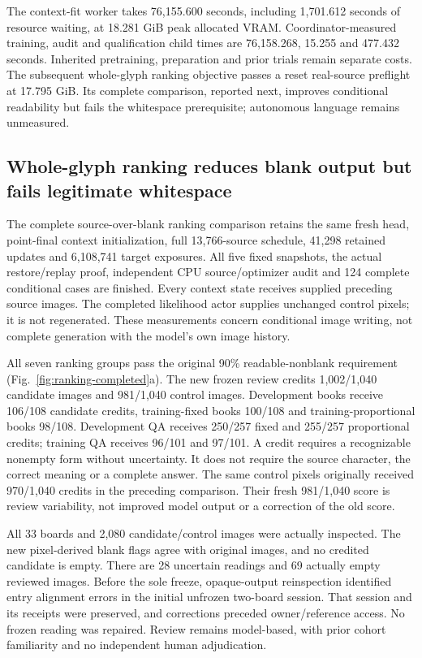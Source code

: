 \documentclass[12pt,a4paper]{article}
\providecommand{\DIFadd}[1]{{\protect\color{blue} \sf #1}} %
\begin{document}
\DIFadd{The context-fit worker takes 76,155.600 seconds, including 1,701.612 seconds of
resource waiting, at 18.281 GiB peak allocated VRAM. Coordinator-measured
training, audit and qualification child times are 76,158.268, 15.255 and
477.432 seconds. Inherited pretraining, preparation and prior trials remain
separate costs. The subsequent whole-glyph ranking objective passes a reset
real-source preflight at 17.795 GiB. Its complete comparison, reported next,
improves conditional readability but fails the whitespace prerequisite;
autonomous language remains unmeasured.
}

\subsection*{\DIFadd{Whole-glyph ranking reduces blank output but fails legitimate whitespace}}

\DIFadd{The complete source-over-blank ranking comparison retains the same fresh head,
point-final context initialization, full 13,766-source schedule, 41,298 retained
updates and 6,108,741 target exposures. All five fixed snapshots, the actual
restore/replay proof, independent CPU source/optimizer audit and 124 complete
conditional cases are finished. Every context state receives supplied preceding
source images. The completed likelihood actor supplies unchanged control pixels;
it is not regenerated. These measurements concern conditional image writing,
not complete generation with the model's own image history.
}

\DIFadd{All seven ranking groups pass the original 90\% readable-nonblank requirement
(Fig.~\ref{fig:ranking-completed}a). The new frozen review credits 1,002/1,040
candidate images and 981/1,040 control images. Development books receive 106/108
candidate credits, training-fixed books 100/108 and training-proportional books
98/108. Development QA receives 250/257 fixed and 255/257 proportional credits;
training QA receives 96/101 and 97/101. A credit requires a recognizable nonempty
form without uncertainty. It does not require the source character, the correct
meaning or a complete answer. The same control pixels originally received
970/1,040 credits in the preceding comparison. Their fresh 981/1,040 score is
review variability, not improved model output or a correction of the old score.
}

\DIFadd{All 33 boards and 2,080 candidate/control images were actually inspected.
The new pixel-derived blank flags agree with original images, and no credited
candidate is empty. There are 28 uncertain readings and 69 actually empty
reviewed images. Before the sole freeze, opaque-output reinspection identified
entry alignment errors in the initial unfrozen two-board session. That session
and its receipts were preserved, and corrections preceded owner/reference
access. No frozen reading was repaired. Review remains model-based, with prior
cohort familiarity and no independent human adjudication.
}
\end{document}
